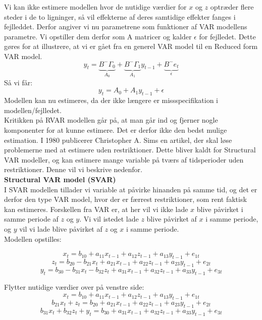 \documentclass[
  10pt,
]{article}
\begin{document}
Vi kan ikke estimere modellen hvor de nutidige værdier for \(x\) og
\(z\) optræder flere steder i de to ligninger, så vil effekterne af
deres samtidige effekter fanges i fejlleddet. Derfor angiver vi nu
parametrene som funktioner af VAR modellens parametre. Vi opstiller dem
derfor som A matricer og kalder \(\epsilon\) for fejlledet. Dette gøres
for at illustrere, at vi er gået fra en generel VAR model til en Reduced
form VAR model.
\[ y_t=\underbrace{B^-\Gamma_0}_{A_0}+\underbrace{B^-\Gamma_1}_{A_1}y_{t-1}+\underbrace{B^-e_t}_{\epsilon}\]
Så vi får: \[ y_t = A_0+A_1y_{t-1}+\epsilon\] Modellen kan nu estimeres,
da der ikke længere er missspecifikation i modellen/fejlledet.\\
Kritikken på RVAR modellen går på, at man går ind og fjerner nogle
komponenter for at kunne estimere. Det er derfor ikke den bedst mulige
estimation. I 1980 publicerer Christopher A. Sims en artikel, der skal
løse problemerne med at estimere uden restriktioner. Dette bliver kaldt
for Structural VAR modeller, og kan estimere mange variable på tværs af
tidsperioder uden restriktioner. Denne vil vi beskrive nedenfor.\\

\textbf{Structural VAR model (SVAR)}\\
I SVAR modellen tillader vi variable at påvirke hinanden på samme tid,
og det er derfor den type VAR model, hvor der er færrest restriktioner,
som rent faktisk kan estimeres. Forskellen fra VAR er, at her vil vi
ikke lade \(x\) blive påvirket i samme periode af \(z\) og \(y\). Vi vil
istedet lade \(z\) blive påvirket af \(x\) i samme periode, og \(y\) vil
vi lade blive påvirket af \(z\) og \(x\) i samme periode.\\
Modellen opstilles:

\[x_t=b_{10}+a_{11}x_{t-1}+a_{12}z_{t-1}+a_{13}y_{t-1}+e_{1t} \]
\[z_t=b_{20}-b_{21}x_t+a_{21}x_{t-1}+a_{22}z_{t-1}+a_{23}y_{t-1}+e_{2t} \]
\[y_t=b_{30}-b_{31}x_t-b_{32}z_t+a_{31}x_{t-1}+a_{32}z_{t-1}+a_{33}y_{t-1}+e_{3t} \]

Flytter nutidige værdier over på venstre side:
\[x_t=b_{10}+a_{11}x_{t-1}+a_{12}z_{t-1}+a_{13}y_{t-1}+e_{1t} \]
\[b_{21}x_t+z_t=b_{20}+a_{21}x_{t-1}+a_{22}z_{t-1}+a_{23}y_{t-1}+e_{2t} \]
\[b_{31}x_t+b_{32}z_t+y_t=b_{30}+a_{31}x_{t-1}+a_{32}z_{t-1}+a_{33}y_{t-1}+e_{3t} \]
\end{document}
